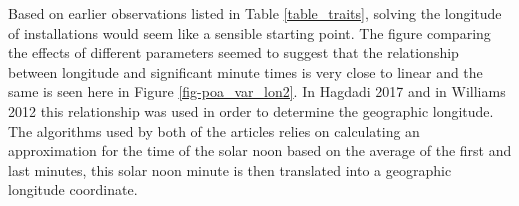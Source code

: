 \noindent Based on earlier observations listed in Table \ref{table_traits}, solving the longitude of installations would seem like a sensible starting point. The figure comparing the effects of different parameters seemed to suggest that the relationship between longitude and significant minute times is very close to linear and the same is seen here in Figure \ref{fig-poa_var_lon2}. In Hagdadi 2017 \cite{navid_australian_article} and in Williams 2012 \cite{older_solar_solver_article} this relationship was used in order to determine the geographic longitude. The algorithms used by both of the articles relies on calculating an approximation for the time of the solar noon based on the average of the first and last minutes, this solar noon minute is then translated into a geographic longitude coordinate.











